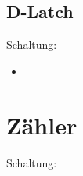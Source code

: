 \documentclass[compress,11pt]{beamer}
\begin{document}
\subsection{D-Latch}

\begin{frame}
Schaltung:\\




\end{frame}
\begin{frame}
\begin{block}
\begin{itemize}
\item 
\end{itemize}
\end{block}
\end{frame}




\section{Zähler}
\begin{frame}
Schaltung:\\





\end{frame}
\begin{frame}

\end{frame}
\end{document}
